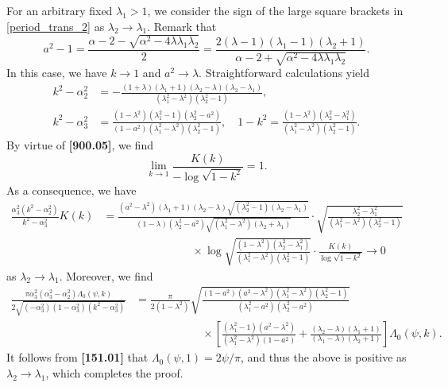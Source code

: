 \documentclass[11pt]{amsart}
\numberwithin{equation}{section}
\numberwithin{figure}{section}
\theoremstyle{plain} %
\theoremstyle{definition} %
\begin{document}
For an arbitrary fixed $\lambda_1>1$, we consider the sign of the large square brackets in \eqref{period_trans_2} as $\lambda_2\to \lambda_1$. 
Remark that 
\[
a^2-1 = \frac{\alpha-2-\sqrt{\alpha^2-4\lambda\lambda_1\lambda_2}}{2}
= \frac{2(\lambda-1)(\lambda_1-1)(\lambda_2+1)}{\alpha-2+\sqrt{\alpha^2-4\lambda\lambda_1\lambda_2}}. 
\]
In this case, we have $k\to 1$ and $a^2\to \lambda$. 
Straightforward calculations yield 
\begin{align*}
k^2-\alpha_2^2 &= -\frac{(1+\lambda)(\lambda_1+1)(\lambda_2-\lambda)(\lambda_2-\lambda_1)}{(\lambda_1^2-\lambda^2)(\lambda_2^2-1)}, \\
k^2-\alpha_3^2 &= \frac{(1-\lambda^2)(\lambda_1^2-1)(\lambda_2^2-a^2)}{(1-a^2)(\lambda_1^2-\lambda^2)(\lambda_2^2-1)}, \quad 
1-k^2 = \frac{(1-\lambda^2)(\lambda_2^2-\lambda_1^2)}{(\lambda_1^2-\lambda^2)(\lambda_2^2-1)}. 
\end{align*}
By virtue of \textbf{[900.05]}, we find 
\[
\lim_{k\to 1} \frac{K(k)}{-\log \sqrt{1-k^2}}=1. 
\]
As a consequence, we have 
\begin{align*}
\frac{\alpha_3^2(k^2-\alpha_2^2)}{k^2-\alpha_3^2} K(k) 
& = \frac{(a^2-\lambda^2)(\lambda_1+1)(\lambda_2-\lambda)\sqrt{(\lambda_2^2-1)(\lambda_2-\lambda_1)}}{(1-\lambda)(\lambda_2^2-a^2)\sqrt{(\lambda_1^2-\lambda^2)(\lambda_2+\lambda_1)}}\cdot 
\sqrt{\frac{\lambda_2^2-\lambda_1^2}{(\lambda_1^2-\lambda^2)(\lambda_2^2-1)}} \\
&\qquad \qquad \qquad \qquad \times \log \sqrt{\frac{(1-\lambda^2)(\lambda_2^2-\lambda_1^2)}{(\lambda_1^2-\lambda^2)(\lambda_2^2-1)}}\cdot \frac{K(k)}{\log \sqrt{1-k^2}}
\to 0
\end{align*}
as $\lambda_2\to\lambda_1$.
Moreover, we find 
\begin{align*}
\frac{\pi\alpha_3^2(\alpha_3^2-\alpha_2^2)\Lambda_0 (\psi,k)}{2\sqrt{(-\alpha_3^2) (1-\alpha_3^2)(k^2-\alpha_3^2)}} 
&  =\frac{\pi}{2(1-\lambda^2)} \sqrt{\frac{(1-a^2)(a^2-\lambda^2)(\lambda_1^2-\lambda^2)(\lambda_2^2-1)}{(\lambda_1^2-a^2)(\lambda_2^2-a^2)}} \\
&\qquad \qquad \qquad \times \left[ \frac{(\lambda_1^2-1)(a^2-\lambda^2)}{(\lambda_1^2-\lambda^2)(1-a^2)}+\frac{(\lambda_2-\lambda)(\lambda_1+1)}{(\lambda_1-\lambda)(\lambda_2+1)}  \right] \Lambda_0 (\psi,k). 
\end{align*}
It follows from \textbf{[151.01]} that $\Lambda_0 (\psi,1) = 2\psi/\pi$, and thus the above is positive as 
$\lambda_2\to\lambda_1$, which completes the proof. 
\end{document}

